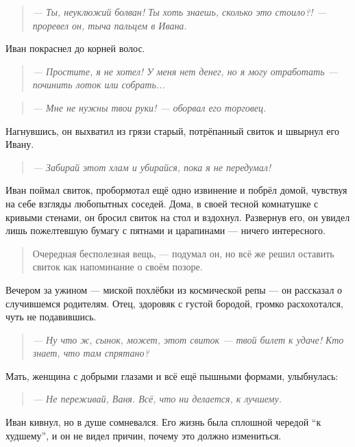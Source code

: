 \documentclass[12pt,a4paper]{book}
\newenvironment{dialogue}{\begin{quote}\itshape}{\end{quote}}
\begin{document}
\begin{dialogue}
--- Ты, неуклюжий болван! Ты хоть знаешь, сколько это стоило?! --- проревел он, тыча пальцем в Ивана.
\end{dialogue}

Иван покраснел до корней волос.

\begin{dialogue}
--- Простите, я не хотел! У меня нет денег, но я могу отработать --- починить лоток или собрать...
\end{dialogue}

\begin{dialogue}
--- Мне не нужны твои руки! --- оборвал его торговец.
\end{dialogue}

Нагнувшись, он выхватил из грязи старый, потрёпанный свиток и швырнул его Ивану.

\begin{dialogue}
--- Забирай этот хлам и убирайся, пока я не передумал!
\end{dialogue}

Иван поймал свиток, пробормотал ещё одно извинение и побрёл домой, чувствуя на себе взгляды любопытных соседей. Дома, в своей тесной комнатушке с кривыми стенами, он бросил свиток на стол и вздохнул. Развернув его, он увидел лишь пожелтевшую бумагу с пятнами и царапинами --- ничего интересного.

\begin{quote}
Очередная бесполезная вещь, --- подумал он, но всё же решил оставить свиток как напоминание о своём позоре.
\end{quote}

Вечером за ужином --- миской похлёбки из космической репы --- он рассказал о случившемся родителям. Отец, здоровяк с густой бородой, громко расхохотался, чуть не подавившись.

\begin{dialogue}
--- Ну что ж, сынок, может, этот свиток --- твой билет к удаче! Кто знает, что там спрятано?
\end{dialogue}

Мать, женщина с добрыми глазами и всё ещё пышными формами, улыбнулась:

\begin{dialogue}
--- Не переживай, Ваня. Всё, что ни делается, к лучшему.
\end{dialogue}

Иван кивнул, но в душе сомневался. Его жизнь была сплошной чередой ``к худшему'', и он не видел причин, почему это должно измениться.
\end{document}
